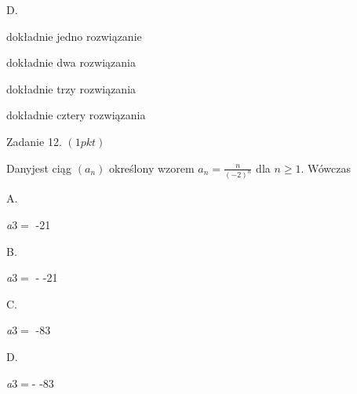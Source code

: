 \documentclass[a4paper,12pt]{article}
\begin{document}
D.

dokładnie jedno rozwiązanie

dokładnie dwa rozwiązania

dokładnie trzy rozwiązania

dokładnie cztery rozwiązania

Zadanie 12. $(1pkt)$

Danyjest ciąg $(a_{n})$ określony wzorem $a_{n}=\displaystyle \frac{n}{(-2)^{n}}$ dla $n\geq 1$. Wówczas

A.

{\it a}3$=$ -21

B.

{\it a}3$=$ - -21

C.

{\it a}3$=$ -83

D.

{\it a}3$=$- -83
\end{document}
